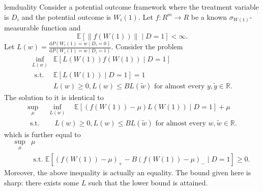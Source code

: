 \documentclass[12pt]{article}
\begin{document}
	\begin{restatable}{lem}{duality}
		\label{duality}
		Consider a potential outcome framework where the treatment variable is $D_i$ and the potential outcome is $W_i(1)$. Let $f:R^m \to R$ be a known $\sigma_{W(1)}$-measurable function and $$\mathbb{E}[\|f(W(1))\| \mid D=1] < \infty.$$
		Let $L(w) = \frac{\mathrm{d} P(W_i(1) = w \mid D_i = 0)}{\mathrm{d} P(W_i(1) = w \mid D_i = 1)}$.
		Consider the problem \begin{equation*}
		\begin{array}{ll}
		\inf _{L(w)} & \mathbb{E}[L(W(1))f(W(1)) \mid D=1] \\
		\text { s.t. } & \mathbb{E}[L(W(1)) \mid D=1]=1 \\
		& L(w) \geq 0, L(w) \leq B L(\tilde{w}) \text { for almost every } y, \tilde{y} \in \mathbb{R}.
		\end{array}
		\end{equation*}
		The solution to it is identical to 
		\begin{equation*}
		\begin{array}{ll}
		\sup _{\mu} & \inf _{L(w)} \quad \mathbb{E}[(f(W(1))-\mu) L(W(1)) \mid D=1]+\mu \\
		\text { s.t. } &\quad  L(w) \geq 0, L(w) \leq B L(\tilde{w}) \text { for almost every } w, \tilde{w} \in \mathbb{R}.
		\end{array}
		\end{equation*}
		which is further equal to
		\begin{equation*}
		\begin{array}{ll}
		\sup _{\mu} & \mu \\
		& \text { s.t. }  \mathbb{E}\left[(f(W(1))-\mu)_{+}-B(f(W(1))-\mu)_{-} \mid D=1\right] \geq 0.
		\end{array}
		\end{equation*}
		Moreover, the above inequality is actually an equality. The bound given here is sharp: there exists some $L$ such that the lower bound is attained.
	\end{restatable} 
	
\end{document}
